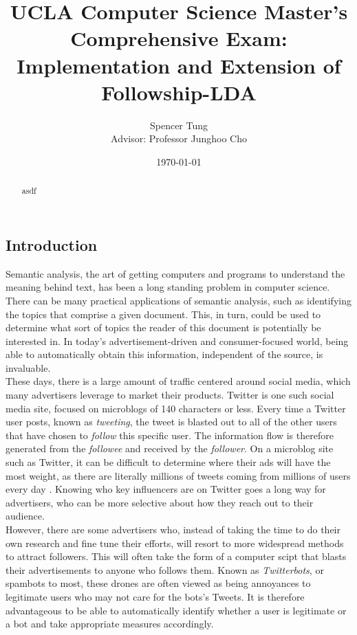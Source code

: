 \documentclass[a4paper]{article}
\title{UCLA Computer Science Master's Comprehensive Exam: Implementation and Extension of Followship-LDA}
\author{Spencer Tung \\ Advisor: Professor Junghoo Cho}
\date{\today}
\begin{document}
\maketitle

\begin{multicols}{2}
\begin{abstract}
asdf
\end{abstract}

\section{Introduction}
Semantic analysis, the art of getting computers and programs to understand the meaning behind text, has been a long standing problem in computer science. There can be many practical applications of semantic analysis, such as identifying the topics that comprise a given document. This, in turn, could be used to determine what sort of topics the reader of this document is potentially be interested in. In today's advertisement-driven and consumer-focused world, being able to automatically obtain this information, independent of the source, is invaluable. \\
These days, there is a large amount of traffic centered around social media, which many advertisers leverage to market their products. Twitter is one such social media site, focused on microblogs of 140 characters or less. Every time a Twitter user posts, known as \textit{tweeting}, the tweet is blasted out to all of the other users that have chosen to \textit{follow} this specific user. The information flow is therefore generated from the \textit{followee} and received by the \textit{follower}. On a microblog site such as Twitter, it can be difficult to determine where their ads will have the most weight, as there are literally millions of tweets coming from millions of users every day \cite{TODO}. Knowing who key influencers are on Twitter goes a long way for advertisers, who can be more selective about how they reach out to their audience.\\
However, there are some advertisers who, instead of taking the time to do their own research and fine tune their efforts, will resort to more widespread methods to attract followers. This will often take the form of a computer scipt that blasts their advertisements to anyone who follows them. Known as \textit{Twitterbots}, or spambots to most, these drones are often viewed as being annoyances to legitimate users who may not care for the bots's Tweets. It is therefore advantageous to be able to automatically identify whether a user is legitimate or a bot and take appropriate measures accordingly. \\

\end{multicols}
\end{document}
